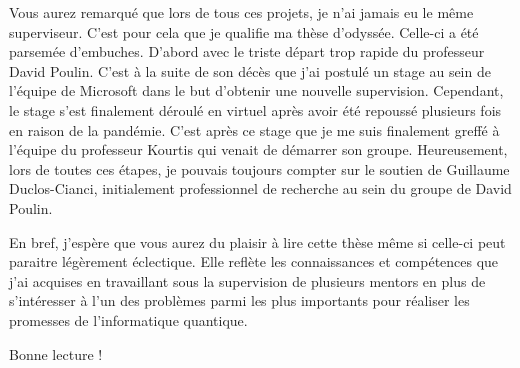 Vous aurez remarqué que lors de tous ces projets,
je n'ai jamais eu le même superviseur.
C'est pour cela que je qualifie ma thèse d'odyssée.
Celle-ci a été parsemée d'embuches.
D'abord avec le triste départ trop rapide du professeur David Poulin.
C'est à la suite de son décès que j'ai postulé un stage au sein de l'équipe de Microsoft
dans le but d'obtenir une nouvelle supervision.
Cependant, le stage s'est finalement déroulé en virtuel après avoir été repoussé
plusieurs fois en raison de la pandémie.
C'est après ce stage que je me suis finalement greffé à l'équipe du professeur Kourtis 
qui venait de démarrer son groupe.
Heureusement,
lors de toutes ces étapes, 
je pouvais toujours compter sur le soutien de Guillaume Duclos-Cianci,
initialement professionnel de recherche au sein du groupe de David Poulin.

En bref,
j'espère que vous aurez du plaisir à lire cette thèse même si celle-ci 
peut paraitre légèrement éclectique.
Elle reflète les connaissances et compétences que j'ai acquises en travaillant sous 
la supervision de plusieurs mentors en plus de s'intéresser à l'un des problèmes
parmi les plus importants pour réaliser les promesses de l'informatique quantique.

Bonne lecture !
